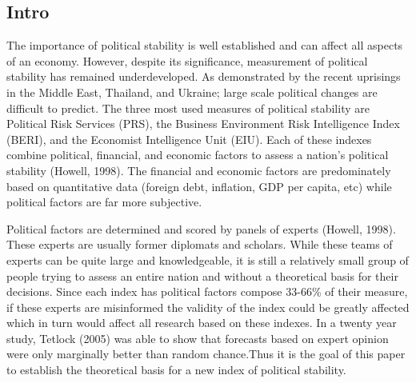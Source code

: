 \documentclass[12pt]{article}
\begin{document}
\begin{spacing}{1.5}



\section{Intro}
The importance of political stability is well established and can affect all aspects of an economy. However, despite its significance, measurement of political stability has remained underdeveloped. As demonstrated by the recent uprisings in the Middle East, Thailand, and Ukraine; large scale political changes are difficult to predict. The three most used measures of political stability are Political Risk Services (PRS), the Business Environment Risk Intelligence Index (BERI), and the Economist Intelligence Unit (EIU). Each of these indexes combine political, financial, and economic factors to assess a nation's political stability (Howell, 1998). The financial and economic factors are predominately based on quantitative data (foreign debt, inflation, GDP per capita, etc) while political factors are far more subjective. 

Political factors are determined and scored by panels of experts (Howell, 1998). These experts are usually former diplomats and scholars. While these teams of experts can be quite large and knowledgeable, it is still a relatively small group of people trying to assess an entire nation and without a theoretical basis for their decisions. Since each index has political factors compose 33-66\% of their measure, if these experts are misinformed the validity of the index could be greatly affected which in turn would affect all research based on these indexes. In a twenty year study, Tetlock (2005) was able to show that forecasts based on expert opinion were only marginally better than random chance.Thus it is the goal of this paper to establish the theoretical basis for a new index of political stability. 


\end{spacing}
\end{document}
